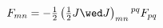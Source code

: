 \begin{equation}
\label{spgfcon}
   F_{mn}=-\tfrac{1}{2} \left(\tfrac{1}{2}J\wed J\right)_{mn}{}^{pq}F_{pq}   
\end{equation}

